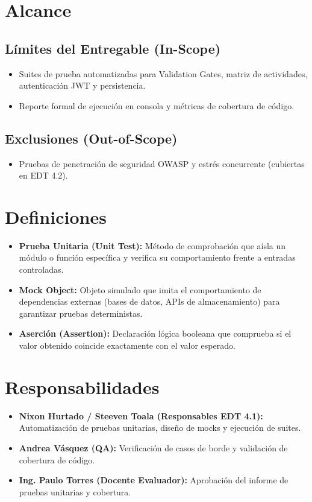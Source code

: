 \documentclass[12pt,a4paper]{article}
\begin{document}
\section{Alcance}
\subsection{Límites del Entregable (In-Scope)}
\begin{itemize}[leftmargin=1.5em, itemsep=2pt]
    \item Suites de prueba automatizadas para Validation Gates, matriz de actividades, autenticación JWT y persistencia.
    \item Reporte formal de ejecución en consola y métricas de cobertura de código.
\end{itemize}
\subsection{Exclusiones (Out-of-Scope)}
\begin{itemize}[leftmargin=1.5em, itemsep=2pt]
    \item Pruebas de penetración de seguridad OWASP y estrés concurrente (cubiertas en EDT 4.2).
\end{itemize}

\section{Definiciones}
\begin{itemize}[leftmargin=1.5em, itemsep=2pt]
    \item \textbf{Prueba Unitaria (Unit Test):} Método de comprobación que aísla un módulo o función específica y verifica su comportamiento frente a entradas controladas.
    \item \textbf{Mock Object:} Objeto simulado que imita el comportamiento de dependencias externas (bases de datos, APIs de almacenamiento) para garantizar pruebas deterministas.
    \item \textbf{Aserción (Assertion):} Declaración lógica booleana que comprueba si el valor obtenido coincide exactamente con el valor esperado.
\end{itemize}

\section{Responsabilidades}
\begin{itemize}[leftmargin=1.5em, itemsep=2pt]
    \item \textbf{Nixon Hurtado / Steeven Toala (Responsables EDT 4.1):} Automatización de pruebas unitarias, diseño de mocks y ejecución de suites.
    \item \textbf{Andrea Vásquez (QA):} Verificación de casos de borde y validación de cobertura de código.
    \item \textbf{Ing. Paulo Torres (Docente Evaluador):} Aprobación del informe de pruebas unitarias y cobertura.
\end{itemize}
\end{document}
